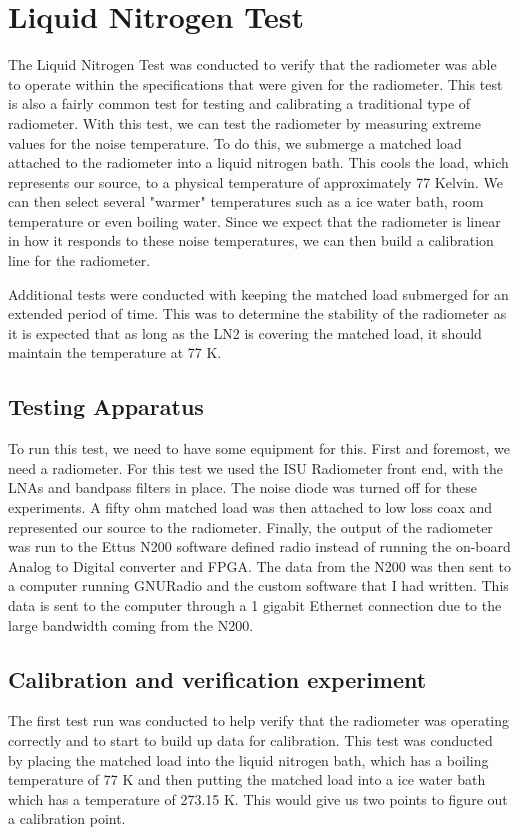 \section{Liquid Nitrogen Test}
The Liquid Nitrogen Test was conducted to verify that the radiometer was able to operate within the specifications that were given for the radiometer.  This test is also a fairly common test for testing and calibrating a traditional type of radiometer.  With this test, we can test the radiometer by measuring extreme values for the noise temperature.  To do this, we submerge a matched load attached to the radiometer into a liquid nitrogen bath.  This cools the load, which represents our source, to a physical temperature of approximately 77 Kelvin.  We can then select several "warmer" temperatures such as a ice water bath, room temperature or even boiling water.  Since we expect that the radiometer is linear in how it responds to these noise temperatures, we can then build a calibration line for the radiometer.

Additional tests were conducted with keeping the matched load submerged for an extended period of time.  This was to determine the stability of the radiometer as it is expected that as long as the LN2 is covering the matched load, it should maintain the temperature at 77 K.  

\subsection{Testing Apparatus}
To run this test, we need to have some equipment for this.  First and foremost, we need a radiometer.  For this test we used the ISU Radiometer front end, with the LNAs and bandpass filters in place.  The noise diode was turned off for these experiments.  A fifty ohm matched load was then attached to low loss coax and represented our source to the radiometer.  Finally, the output of the radiometer was run to the Ettus N200 software defined radio instead of running the on-board Analog to Digital converter and FPGA.  The data from the N200 was then sent to a computer running GNURadio and the custom software that I had written.  This data is sent to the computer through a 1 gigabit Ethernet connection due to the large bandwidth coming from the N200.

\subsection{Calibration and verification experiment}
The first test run was conducted to help verify that the radiometer was operating correctly and to start to build up data for calibration.  This test was conducted by placing the matched load into the liquid nitrogen bath, which has a boiling temperature of 77 K and then putting the matched load into a ice water bath which has a temperature of 273.15 K.  This would give us two points to figure out a calibration point.

